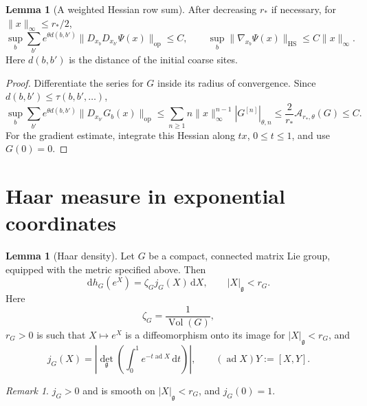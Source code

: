 \documentclass[10pt,reqno]{amsart}
\theoremstyle{definition}
\newtheorem{lemma}[definition]{Lemma}
\theoremstyle{remark}
\newtheorem{remark}[definition]{Remark}
\numberwithin{equation}{section}
\numberwithin{figure}{section}
\newcommand{\g}{\mathfrak g}
\newcommand{\dd}{\mathrm d}
\DeclareMathOperator{\ad}{ad}
\DeclareMathOperator{\Vol}{Vol}
\begin{document}
\begin{lemma}[A weighted Hessian row sum]\label{lem:stationary-energy-hessian-row}
After decreasing $r_*$ if necessary, for $\|x\|_\infty\le r_*/2$,
\begin{equation}\label{eq:stationary-energy-hessian-row}
\sup_b\sum_{b'}e^{\theta d(b,b')}
\|D_{x_b}D_{x_{b'}}\Psi(x)\|_{\mathrm{op}}\le C,\qquad
\sup_b\|\nabla_{x_b}\Psi(x)\|_{\mathrm{HS}}\le C\|x\|_\infty.
\end{equation}
Here $d(b,b')$ is the distance of the initial coarse sites.
\end{lemma}
\begin{proof}
Differentiate the series for $G$ inside its radius of convergence.
Since $d(b,b')\le\tau(b,b',\ldots)$,
\begin{equation}\label{eq:stationary-hessian-series-bound}
\sup_b\sum_{b'}e^{\theta d(b,b')}
\|D_{x_{b'}}G_b(x)\|_{\mathrm{op}}
\le\sum_{n\ge1}n\|x\|_\infty^{n-1}|G^{[n]}|_{\theta,n}
\le\frac2{r_*}\mathcal A_{r_*,\theta}(G)\le C.
\end{equation}
For the gradient estimate, integrate this Hessian along $tx$,
$0\le t\le1$, and use $G(0)=0$.
\end{proof}


\appendix
\section{Haar measure in exponential coordinates}\label{sec:haar-appendix}
\begin{lemma}[Haar density]\label{lem:haar-density}
Let $G$ be a compact, connected matrix Lie group, equipped with the metric specified above. Then
\begin{equation}\label{eq:display-102}
\boxed{
\dd h_G(e^X)=\zeta_Gj_G(X)\,\dd X,\qquad |X|_{\g}<r_G.
}
\end{equation}
Here
\begin{equation}\label{eq:display-103}
\zeta_G=\frac1{\Vol(G)},
\end{equation}
$r_G>0$ is such that $X\mapsto e^X$ is a diffeomorphism onto its image for $|X|_\g<r_G$, and
\begin{equation}\label{eq:display-104}
j_G(X)=\left|\det_{\g}\left(\int_0^1e^{-t\ad X}\,\dd t\right)\right|,
\qquad (\ad X)Y:=[X,Y].
\end{equation}
\end{lemma}

\begin{remark} $j_G>0$ and is smooth on $|X|_\g<r_G$, and $j_G(0)=1$.\end{remark}
\end{document}
